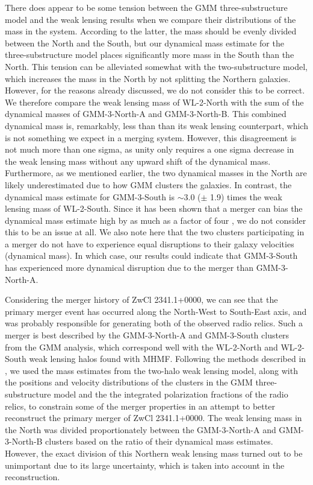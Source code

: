 \documentclass[onecolumn]{aastex}
\begin{document}
There does appear to be some tension between the GMM three-substructure model and the weak lensing results when we compare their distributions of the mass in the system.  According to the latter, the mass should be evenly divided between the North and the South, but our dynamical mass estimate for the three-substructure model places significantly more mass in the South than the North.  This tension can be alleviated somewhat with the two-substructure model, which increases the mass in the North by not splitting the Northern galaxies.  However, for the reasons already discussed, we do not consider this to be correct.  We therefore compare the weak lensing mass of WL-2-North with the sum of the dynamical masses of GMM-3-North-A and GMM-3-North-B.  This combined dynamical mass is, remarkably, less than than its weak lensing counterpart, which is not something we expect in a merging system.  However, this disagreement is not much more than one sigma, as unity only requires a one sigma decrease in the weak lensing mass without any upward shift of the dynamical mass.  Furthermore, as we mentioned earlier, the two dynamical masses in the North are likely underestimated due to how GMM clusters the galaxies.  In contrast, the dynamical mass estimate for GMM-3-South is $\sim$3.0 ($\pm$ 1.9) times  the weak lensing mass of WL-2-South.  Since it has been shown that a merger can bias the dynamical mass estimate high by as much as a factor of four \citep{Pinkney96}, we do not consider this to be an issue at all.  We also note here that the two clusters participating in a merger do not have to experience equal disruptions to their galaxy velocities (dynamical mass).  In which case, our results could indicate that GMM-3-South has experienced more dynamical disruption due to the merger than GMM-3-North-A.

Considering the merger history of ZwCl 2341.1+0000, we can see that the primary merger event has occurred along the North-West to South-East axis, and was probably responsible for generating both of the observed radio relics.  Such a merger is best described by the GMM-3-North-A and GMM-3-South clusters from the GMM analysis, which correspond well with the WL-2-North and WL-2-South weak lensing halos found with MHMF.  Following the methods described in \cite{Dawson13}, we used the mass estimates from the two-halo weak lensing model, along with the positions and velocity distributions of the clusters in the GMM three-substructure model and the the integrated polarization fractions of the radio relics, to constrain some of the merger properties in an attempt to better reconstruct the primary merger of ZwCl 2341.1+0000.  The weak lensing mass in the North was divided proportionately between the GMM-3-North-A and GMM-3-North-B clusters based on the ratio of their dynamical mass estimates.  However, the exact division of this Northern weak lensing mass turned out to be unimportant due to its large uncertainty, which is taken into account in the reconstruction.
\end{document}

